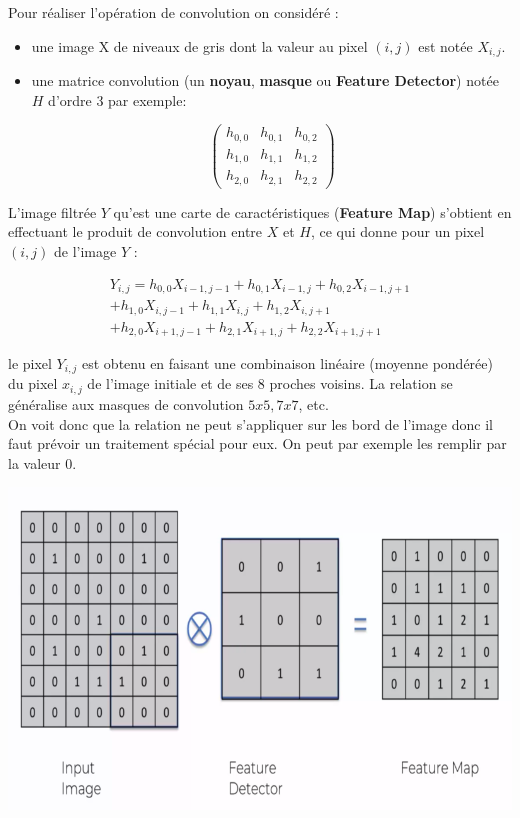Pour réaliser l’opération de convolution on considéré :
\begin{itemize}
\item une image X de niveaux de gris dont la valeur au pixel $(i, j)$ est  notée $X_{i,j}$.
\item une matrice convolution (un \textbf{noyau}, \textbf{masque} ou \textbf{Feature Detector}) notée $H$ d’ordre 3 par exemple:
	\begin{center}
		$$\begin{pmatrix}
			h_{0,0} & h_{0,1} & h_{0,2}\\
			h_{1,0} & h_{1,1} & h_{1,2}\\
			h_{2,0} & h_{2,1} & h_{2,2}
		\end{pmatrix}$$
	\end{center}
\end{itemize}
L’image filtrée $Y$ qu’est une carte de caractéristiques (\textbf{Feature Map}) s’obtient en effectuant le produit de convolution entre $X$ et $H$, ce qui donne pour un pixel $(i, j)$ de l’image $Y$ :
\begin{center}
\begin{multline}
Y_{i,j} = h_{0,0}X_{i-1,j-1} + h_{0,1}X_{i-1,j} + h_{0,2}X_{i-1,j+1}\\
     	  + h_{1,0}X_{i,j-1} + h_{1,1}X_{i,j}  + h_{1,2}X_{i,j+1} \\
        	  + h_{2,0}X_{i+1,j-1} + h_{2,1}X_{i+1,j} + h_{2,2}X_{i+1,j+1}
\end{multline}
\end{center}

le pixel $Y_{i,j}$ est obtenu en faisant une combinaison linéaire (moyenne pondérée) du pixel $x_{i,j}$ de l’image initiale et de ses $8$ proches voisins. La relation se généralise aux masques  de convolution $5x5, 7x7$, etc.\\

On voit donc que la relation ne peut s’appliquer sur les bord de l’image donc il faut prévoir un traitement spécial pour eux. On peut par exemple les remplir par la valeur $0$.\\
\begin{center}
	\includegraphics[scale=0.3]{img10.png}
\end{center}

